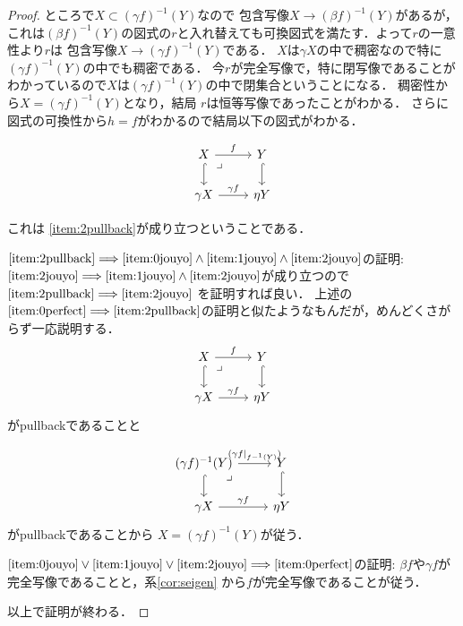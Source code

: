 \documentclass[leqno, a4paper, 12pt, dvipdfmx]{jsarticle}
\newcommand{\To}{\Longrightarrow}
\begin{document}
\begin{proof}
ところで$X\subset (\gamma f)^{-1}(Y)$なので
包含写像$X\to (\beta f)^{-1}(Y)$があるが，
これは$(\beta f)^{-1}(Y)$の図式の$r$と入れ替えても可換図式を満たす．よって$r$の一意性より$r$は
包含写像$X\to (\gamma f)^{-1}(Y)$である．
$X$は$\gamma X$の中で稠密なので特に
$(\gamma f)^{-1}(Y)$の中でも稠密である．
今$r$が完全写像で，特に閉写像であることがわかっているので$X$は$(\gamma f)^{-1}(Y)$の中で閉集合ということになる．
稠密性から$X=(\gamma f)^{-1}(Y)$となり，結局
$r$は恒等写像であったことがわかる．
さらに図式の可換性から$h=f$がわかるので結局以下の図式がわかる．


\[
\begin{tikzcd}
X  \arrow[dr, phantom, "\lrcorner", very near start]\arrow[r,"f"] \arrow[d, hook, ""] & Y \arrow[d, hook, ""] \\
\gamma X\arrow[r,"\gamma f"] &  \eta Y
\end{tikzcd}
\]


これは
\ref{item:2pullback}が成り立つということである．

$\ref{item:2pullback}\To \ref{item:0jouyo}\land \ref{item:1jouyo}\land \ref{item:2jouyo}$の証明: 
$\ref{item:2jouyo}\To \ref{item:1jouyo}\land \ref{item:2jouyo}$が成り立つので
$\ref{item:2pullback}\To \ref{item:2jouyo}$
を証明すれば良い．
上述の
$\ref{item:0perfect}\To \ref{item:2pullback}$の証明と似たようなもんだが，めんどくさがらず一応説明する．
\[
\begin{tikzcd}
X  \arrow[dr, phantom, "\lrcorner", very near start]\arrow[r,"f"] \arrow[d, hook, ""] & Y \arrow[d, hook, ""] \\
\gamma X\arrow[r,"\gamma f"] &  \eta Y
\end{tikzcd}
\]
がpullbackであることと

\[
\begin{tikzcd}
(\gamma f)^{-1}(Y)  \arrow[dr, phantom, "\lrcorner", very near start]\arrow[r,"(\gamma f|_{f-^{1}(Y)})"] \arrow[d, hook, ""] & Y \arrow[d, hook, ""] \\
\gamma X\arrow[r,"\gamma f"] &  \eta Y
\end{tikzcd}
\]
がpullbackであることから
$X=(\gamma f)^{-1}(Y)$が従う．


$\ref{item:0jouyo}\lor \ref{item:1jouyo}\lor \ref{item:2jouyo}\To \ref{item:0perfect}$の証明:
$\beta f$や$\gamma f$が完全写像であることと，系\ref{cor:seigen}
から$f$が完全写像であることが従う．




以上で証明が終わる．
\end{proof}
\end{document}
